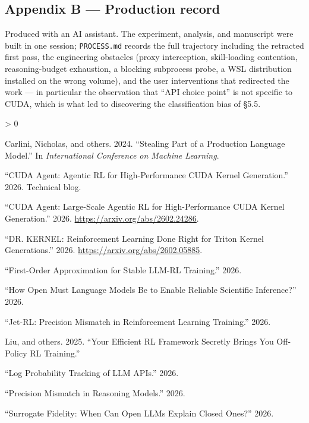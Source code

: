 \documentclass[
  11pt,
]{article}
\newlength{\cslhangindent}
\newenvironment{CSLReferences}[2] %
 {%
  \setlength{\parindent}{0pt}
  \ifodd #1 \everypar{\setlength{\hangindent}{\cslhangindent}}\ignorespaces\fi
  \ifnum #2 > 0
  \setlength{\parskip}{#2\baselineskip}
  \fi
 }%
 {}
\begin{document}
\hypertarget{appendix-b-production-record}{%
\subsection{Appendix B --- Production
record}\label{appendix-b-production-record}}

Produced with an AI assistant. The experiment, analysis, and manuscript
were built in one session; \texttt{PROCESS.md} records the full
trajectory including the retracted first pass, the engineering obstacles
(proxy interception, skill-loading contention, reasoning-budget
exhaustion, a blocking subprocess probe, a WSL distribution installed on
the wrong volume), and the user interventions that redirected the work
--- in particular the observation that ``API choice point'' is not
specific to CUDA, which is what led to discovering the classification
bias of §5.5.

\hypertarget{refs}{}
\begin{CSLReferences}{1}{0}
\leavevmode{}%
Carlini, Nicholas, and others. 2024. {``Stealing Part of a Production
Language Model.''} In \emph{International Conference on Machine
Learning}.

\leavevmode{}%
{``{CUDA Agent}: Agentic {RL} for High-Performance {CUDA} Kernel
Generation.''} 2026. Technical blog.

\leavevmode{}%
{``{CUDA Agent}: Large-Scale Agentic {RL} for High-Performance {CUDA}
Kernel Generation.''} 2026. \url{https://arxiv.org/abs/2602.24286}.

\leavevmode{}%
{``{DR. KERNEL}: Reinforcement Learning Done Right for {Triton} Kernel
Generations.''} 2026. \url{https://arxiv.org/abs/2602.05885}.

\leavevmode{}%
{``First-Order Approximation for Stable {LLM-RL} Training.''} 2026.

\leavevmode{}%
{``How Open Must Language Models Be to Enable Reliable Scientific
Inference?''} 2026.

\leavevmode{}%
{``{Jet-RL}: Precision Mismatch in Reinforcement Learning Training.''}
2026.

\leavevmode{}%
Liu, and others. 2025. {``Your Efficient {RL} Framework Secretly Brings
You Off-Policy {RL} Training.''}

\leavevmode{}%
{``Log Probability Tracking of {LLM} {APIs}.''} 2026.

\leavevmode{}%
{``Precision Mismatch in Reasoning Models.''} 2026.

\leavevmode{}%
{``Surrogate Fidelity: When Can Open {LLMs} Explain Closed Ones?''}
2026.

\end{CSLReferences}
\end{document}
